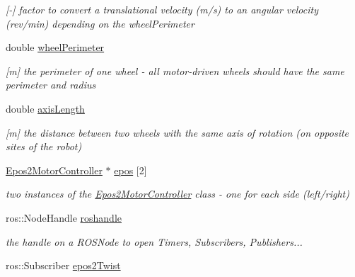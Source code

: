\begin{DoxyCompactItemize}
\begin{DoxyCompactList}\small\item\em \mbox{[}-\/\mbox{]} factor to convert a translational velocity (m/s) to an angular velocity (rev/min) depending on the wheel\-Perimeter \end{DoxyCompactList}\item 
\hypertarget{structTankSteering_1_1tankSet_a6876c0ad344c0baf2f63fbe8da846af1}{double \hyperlink{structTankSteering_1_1tankSet_a6876c0ad344c0baf2f63fbe8da846af1}{wheel\-Perimeter}}\label{structTankSteering_1_1tankSet_a6876c0ad344c0baf2f63fbe8da846af1}

\begin{DoxyCompactList}\small\item\em \mbox{[}m\mbox{]} the perimeter of one wheel -\/ all motor-\/driven wheels should have the same perimeter and radius \end{DoxyCompactList}\item 
\hypertarget{structTankSteering_1_1tankSet_a546f41c6c1e7d0ba11e7a096c41d52cd}{double \hyperlink{structTankSteering_1_1tankSet_a546f41c6c1e7d0ba11e7a096c41d52cd}{axis\-Length}}\label{structTankSteering_1_1tankSet_a546f41c6c1e7d0ba11e7a096c41d52cd}

\begin{DoxyCompactList}\small\item\em \mbox{[}m\mbox{]} the distance between two wheels with the same axis of rotation (on opposite sites of the robot) \end{DoxyCompactList}\item 
\hypertarget{structTankSteering_1_1tankSet_a0c1ff021afbf7602a5593ca973b25246}{\hyperlink{classEpos2MotorController}{Epos2\-Motor\-Controller} $\ast$ \hyperlink{structTankSteering_1_1tankSet_a0c1ff021afbf7602a5593ca973b25246}{epos} \mbox{[}2\mbox{]}}\label{structTankSteering_1_1tankSet_a0c1ff021afbf7602a5593ca973b25246}

\begin{DoxyCompactList}\small\item\em two instances of the \hyperlink{classEpos2MotorController}{Epos2\-Motor\-Controller} class -\/ one for each side (left/right) \end{DoxyCompactList}\item 
ros\-::\-Node\-Handle \hyperlink{structTankSteering_1_1tankSet_a56100d71c75a60b1bee858cac36bd28b}{roshandle}
\begin{DoxyCompactList}\small\item\em the handle on a R\-O\-S\-Node to open Timers, Subscribers, Publishers... \end{DoxyCompactList}\item 
\hypertarget{structTankSteering_1_1tankSet_a98ce962e2398504d19e9ec5d337b520f}{ros\-::\-Subscriber \hyperlink{structTankSteering_1_1tankSet_a98ce962e2398504d19e9ec5d337b520f}{epos2\-Twist}}\label{structTankSteering_1_1tankSet_a98ce962e2398504d19e9ec5d337b520f}


\end{DoxyCompactItemize}
